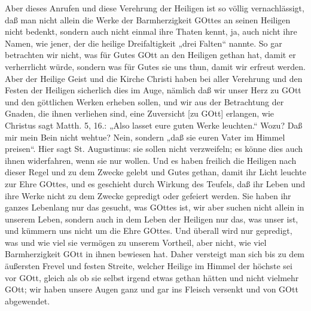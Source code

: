 Aber dieses Anrufen und diese Verehrung der Heiligen ist so völlig vernachlässigt, daß man nicht allein die Werke der Barmherzigkeit GOttes an seinen Heiligen nicht bedenkt, sondern auch nicht einmal ihre Thaten kennt, ja, auch nicht ihre Namen, wie jener, der die heilige Dreifaltigkeit „drei Falten“ nannte. So gar betrachten wir nicht, was für Gutes GOtt an den Heiligen gethan hat, damit er verherrlicht würde, sondern was für Gutes sie uns thun, damit wir erfreut werden. Aber der Heilige Geist und die Kirche Christi haben bei aller Verehrung und den Festen der Heiligen sicherlich dies im Auge, nämlich daß wir unser Herz zu GOtt und den göttlichen Werken erheben sollen, und wir aus der Betrachtung der Gnaden, die ihnen verliehen sind, eine Zuversicht [zu GOtt] erlangen, wie Christus sagt Matth. 5, 16.: „Also lasset eure guten Werke leuchten.“ Wozu? Daß mir mein Bein nicht wehtue? Nein, sondern „daß sie euren Vater im Himmel preisen“. Hier sagt St. Augustinus: sie sollen nicht verzweifeln; es könne dies auch ihnen widerfahren, wenn sie nur wollen. Und es haben freilich die Heiligen nach dieser Regel und zu dem Zwecke gelebt und Gutes gethan, damit ihr Licht leuchte zur Ehre GOttes, und es geschieht durch Wirkung des Teufels, daß ihr Leben und ihre Werke nicht zu dem Zwecke gepredigt oder gefeiert werden. Sie haben ihr ganzes Lebenlang nur das gesucht, was GOttes ist, wir aber suchen nicht allein in unserem Leben, sondern auch in dem Leben der Heiligen nur das, was unser ist, und kümmern uns nicht um die Ehre GOttes. Und überall wird nur gepredigt, was und wie viel sie vermögen zu unserem Vortheil, aber nicht, wie viel Barmherzigkeit GOtt in ihnen bewiesen hat. Daher versteigt man sich bis zu dem äußersten Frevel und festen Streite, welcher Heilige im Himmel der höchste sei vor GOtt, gleich als ob sie selbst irgend etwas gethan hätten und nicht vielmehr GOtt; wir haben unsere Augen ganz und gar ins Fleisch versenkt und von GOtt abgewendet.

